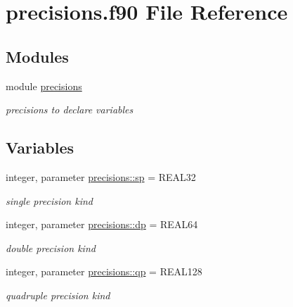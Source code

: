 \hypertarget{precisions_8f90}{}\section{precisions.\+f90 File Reference}
\label{precisions_8f90}
\subsection*{Modules}
\begin{DoxyCompactItemize}
\item 
module \hyperlink{namespaceprecisions}{precisions}
\begin{DoxyCompactList}\small\item\em precisions to declare variables \end{DoxyCompactList}\end{DoxyCompactItemize}
\subsection*{Variables}
\begin{DoxyCompactItemize}
\item 
integer, parameter \hyperlink{namespaceprecisions_a82ad0ad3a64dfde3aab0a00aff168e0d}{precisions\+::sp} = R\+E\+A\+L32
\begin{DoxyCompactList}\small\item\em single precision kind \end{DoxyCompactList}\item 
integer, parameter \hyperlink{namespaceprecisions_a70c0046430d95734ae5df77254ce2897}{precisions\+::dp} = R\+E\+A\+L64
\begin{DoxyCompactList}\small\item\em double precision kind \end{DoxyCompactList}\item 
integer, parameter \hyperlink{namespaceprecisions_a3ab2fa4401db1cceb93ec85a83aa4a90}{precisions\+::qp} = R\+E\+A\+L128
\begin{DoxyCompactList}\small\item\em quadruple precision kind \end{DoxyCompactList}\end{DoxyCompactItemize}

